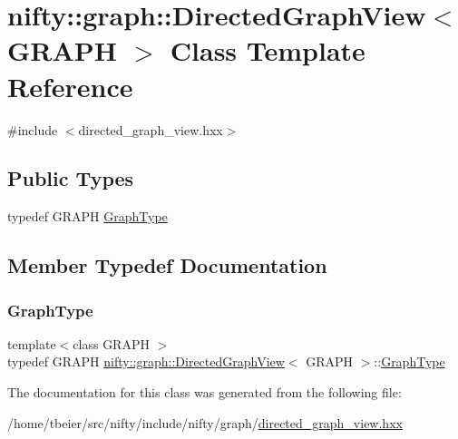 \hypertarget{classnifty_1_1graph_1_1DirectedGraphView}{}\section{nifty\+:\+:graph\+:\+:Directed\+Graph\+View$<$ G\+R\+A\+PH $>$ Class Template Reference}
\label{classnifty_1_1graph_1_1DirectedGraphView}


{\ttfamily \#include $<$directed\+\_\+graph\+\_\+view.\+hxx$>$}

\subsection*{Public Types}
\begin{DoxyCompactItemize}
\item 
typedef G\+R\+A\+PH \hyperlink{classnifty_1_1graph_1_1DirectedGraphView_abbbfb94d0474216ae2d7411838494108}{Graph\+Type}
\end{DoxyCompactItemize}


\subsection{Member Typedef Documentation}
\mbox{\label{classnifty_1_1graph_1_1DirectedGraphView_abbbfb94d0474216ae2d7411838494108}} 
\subsubsection{\texorpdfstring{Graph\+Type}{GraphType}}
{\footnotesize\ttfamily template$<$class G\+R\+A\+PH $>$ \\
typedef G\+R\+A\+PH \hyperlink{classnifty_1_1graph_1_1DirectedGraphView}{nifty\+::graph\+::\+Directed\+Graph\+View}$<$ G\+R\+A\+PH $>$\+::\hyperlink{classnifty_1_1graph_1_1DirectedGraphView_abbbfb94d0474216ae2d7411838494108}{Graph\+Type}}



The documentation for this class was generated from the following file\+:\begin{DoxyCompactItemize}
\item 
/home/tbeier/src/nifty/include/nifty/graph/\hyperlink{directed__graph__view_8hxx}{directed\+\_\+graph\+\_\+view.\+hxx}\end{DoxyCompactItemize}
